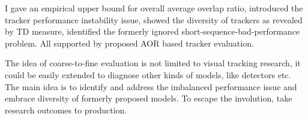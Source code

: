 \documentclass{article}
\begin{document}
I gave an empirical upper bound for overall average overlap ratio, introduced the tracker performance instability issue, showed the diversity of trackers as revealed by TD measure, identified the formerly ignored short-sequence-bad-performance problem. All supported by proposed AOR based tracker evaluation.


The idea of coarse-to-fine evaluation is not limited to visual tracking research, it could be easily extended to diagnose other kinds of models, like detectors etc. The main idea is to identify and address the imbalanced performance issue and embrace diversity of formerly proposed models. To escape the involution, take research outcomes to production.

  

\end{document}
